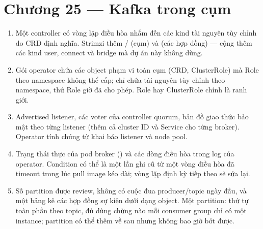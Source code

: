 \section*{Chương 25 --- Kafka trong cụm}
\begin{enumerate}
  \item Một controller có vòng lặp điều hòa nhắm đến các kind tài
  nguyên tùy chỉnh do CRD định nghĩa. Strimzi thêm
  / (cụm) và  (các hợp
  đồng) --- cộng thêm các kind user, connect và bridge mà dự án này
  không dùng.
  \item Gói operator chứa các object phạm vi toàn cụm (CRD, ClusterRole)
  mà Role theo namespace không thể cấp;  chỉ chứa tài
  nguyên tùy chỉnh theo namespace, thứ Role giờ đã cho phép. Role hay
  ClusterRole chính là ranh giới.
  \item Advertised listener, các voter của controller quorum, bản đồ
  giao thức bảo mật theo từng listener (thêm cả cluster ID và Service
  cho từng broker). Operator tính chúng từ khai báo listener và node
  pool.
  \item Trạng thái thực của pod broker () và các dòng
  điều hòa trong log của operator. Condition có thể là một lần ghi cũ
  từ một vòng điều hòa đã timeout trong lúc pull image kéo dài; vòng
  lặp định kỳ tiếp theo sẽ sửa lại.
  \item Số partition được review, không có cuộc đua producer/topic ngày
  đầu, và một bảng kê các hợp đồng sự kiện dưới dạng object. Một
  partition: thứ tự toàn phần theo topic, đủ dùng chừng nào mỗi consumer
  group chỉ có một instance; partition có thể thêm về sau nhưng không
  bao giờ bớt được.
\end{enumerate}

